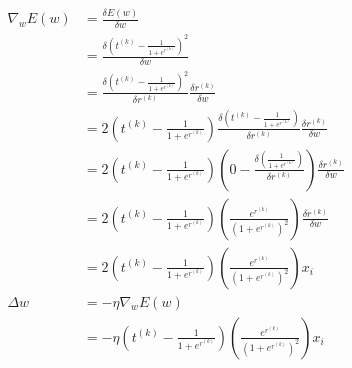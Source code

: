 \documentclass[12pt,a4paper]{article}
\begin{document}
\begin{align*}
	\nabla_w E(w) &= \frac{\delta E(w)}{\delta w}\\
	&= \frac{\delta \left( t^{(k)} - \frac{1}{1+e^{r^{(k)}}} \right)^2}{\delta w}\\
	&= \frac{\delta \left( t^{(k)} - \frac{1}{1+e^{r^{(k)}}} \right)^2}{\delta r^{(k)}} \frac{\delta r^{(k)}}{\delta w}\\
	&= 2\left( t^{(k)} - \frac{1}{1+e^{r^{(k)}}} \right) \frac{\delta \left( t^{(k)} - \frac{1}{1+e^{r^{(k)}}} \right)}{\delta r^{(k)}} \frac{\delta r^{(k)}}{\delta w}\\
	&= 2\left( t^{(k)} - \frac{1}{1+e^{r^{(k)}}} \right) \left ( 0 - \frac{\delta \left(\frac{1}{1+e^{r^{(k)}}} \right)}{\delta r^{(k)}} \right) \frac{\delta r^{(k)}}{\delta w}\\
	&= 2\left( t^{(k)} - \frac{1}{1+e^{r^{(k)}}} \right) \left (\frac{e^{r^{(k)}}}{(1+e^{r^{(k)}})^2} \right) \frac{\delta r^{(k)}}{\delta w}\\
	&= 2\left( t^{(k)} - \frac{1}{1+e^{r^{(k)}}} \right) \left (\frac{e^{r^{(k)}}}{(1+e^{r^{(k)}})^2} \right)x_i\\
	\Delta w &= -\eta \nabla_wE(w)\\
	&= -\eta\left( t^{(k)} - \frac{1}{1+e^{r^{(k)}}} \right) \left (\frac{e^{r^{(k)}}}{(1+e^{r^{(k)}})^2} \right)x_i\\
\end{align*}
\end{document}
